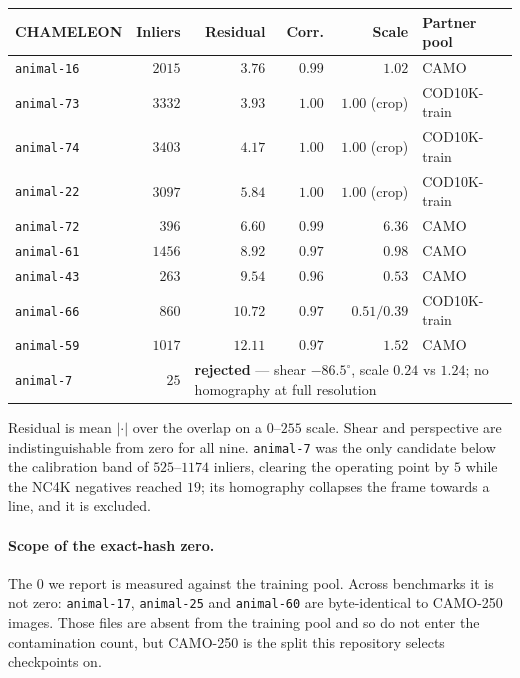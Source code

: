\documentclass{article} %
\begin{document}
\begin{center}\small
\begin{tabular}{lrrrrl}
\toprule
CHAMELEON & Inliers & Residual & Corr. & Scale & Partner pool \\
\midrule
\texttt{animal-16} & $2015$ & $3.76$ & $0.99$ & $1.02$ & CAMO \\
\texttt{animal-73} & $3332$ & $3.93$ & $1.00$ & $1.00$ (crop) & COD10K-train \\
\texttt{animal-74} & $3403$ & $4.17$ & $1.00$ & $1.00$ (crop) & COD10K-train \\
\texttt{animal-22} & $3097$ & $5.84$ & $1.00$ & $1.00$ (crop) & COD10K-train \\
\texttt{animal-72} & $396$ & $6.60$ & $0.99$ & $6.36$ & CAMO \\
\texttt{animal-61} & $1456$ & $8.92$ & $0.97$ & $0.98$ & CAMO \\
\texttt{animal-43} & $263$ & $9.54$ & $0.96$ & $0.53$ & CAMO \\
\texttt{animal-66} & $860$ & $10.72$ & $0.97$ & $0.51/0.39$ & COD10K-train \\
\texttt{animal-59} & $1017$ & $12.11$ & $0.97$ & $1.52$ & CAMO \\
\midrule
\texttt{animal-7} & $25$ & \multicolumn{4}{l}{\textbf{rejected} --- shear $-86.5^\circ$, scale $0.24$ vs $1.24$; no homography at full resolution} \\
\bottomrule
\end{tabular}
\end{center}

Residual is mean $|{\cdot}|$ over the overlap on a $0$--$255$ scale. Shear and perspective are
indistinguishable from zero for all nine. \texttt{animal-7} was the only candidate below the
calibration band of $525$--$1174$ inliers, clearing the operating point by $5$ while the NC4K
negatives reached $19$; its homography collapses the frame towards a line, and it is excluded.

\paragraph{Scope of the exact-hash zero.} The $0$ we report is measured against the training pool.
Across benchmarks it is not zero: \texttt{animal-17}, \texttt{animal-25} and \texttt{animal-60} are
byte-identical to CAMO-250 images. Those files are absent from the training pool and so do not enter
the contamination count, but CAMO-250 is the split this repository selects checkpoints on.
\end{document}
